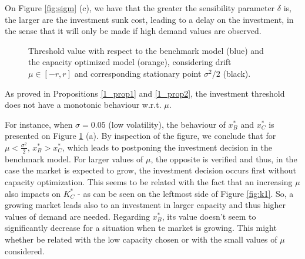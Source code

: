 On Figure \ref{fig:sigm} (c), we have that the greater the sensibility parameter $\delta$ is, the larger are the investment sunk cost, leading to a delay on the investment, in the sense that it will only be made if high demand values are observed.

\begin{figure}[!htb]
	\begin{subfigmatrix}{2}
	\end{subfigmatrix}
	\caption{Threshold value with respect to the benchmark model (blue) and the capacity optimized model (orange), considering drift $\mu \in [-r, r]$ and corresponding stationary point $\sigma^2/2$ (black).}
	\label{fig:mu}
\end{figure}

As proved in Propositions \ref{1_prop1} and \ref{1_prop2}, the investment threshold does not have a monotonic behaviour w.r.t. $\mu$. 

For instance, when $\sigma=0.05$ (low volatility), the behaviour of $x^*_B$ and $x^*_C$ is presented on Figure \ref{fig:mu} (a). By inspection of the figure, we conclude that for $\mu<\frac{\sigma^2}{2}$, $x^*_B>x^*_C$, which leads to postponing the investment decision in the benchmark model. For larger values of $\mu$, the opposite is verified and thus, in the case the market is expected to grow, the investment decision occurs first without capacity optimization. This seems to be related with the fact that an increasing $\mu$ also impacts on $K_C^*$ - as can be seen on the leftmost side of Figure \ref{fig:k1}. So, a growing market leads also to an investment in larger capacity and thus higher values of demand are needed. Regarding $x^*_B$, its value doesn't seem to significantly decrease for a situation when te market is growing. This might whether be related with the low capacity chosen or with the small values of $\mu$ considered.

